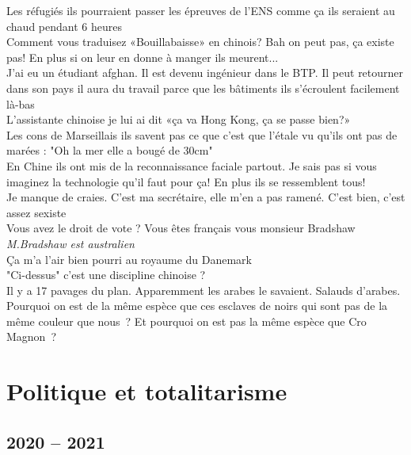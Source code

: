 \documentclass[french, a4paper, openany]{book}
\begin{document}
	\noindent \og Les réfugiés ils pourraient passer les épreuves de l'ENS comme ça ils seraient au chaud pendant 6 heures \fg \\
	\og Comment vous traduisez «Bouillabaisse» en chinois? Bah on peut pas, ça existe pas! En plus si on leur en donne à manger ils meurent... \fg \\
	\og J'ai eu un étudiant afghan. Il est devenu ingénieur dans le BTP. Il peut retourner dans son pays il aura du travail parce que les bâtiments ils s'écroulent facilement là-bas \fg \\
	\og L'assistante chinoise je lui ai dit «ça va Hong Kong, ça se passe bien?» \fg \\
	\og Les cons de Marseillais ils savent pas ce que c'est que l'étale vu qu'ils ont pas de marées : "Oh la mer elle a bougé de 30cm" \fg \\
	\og En Chine ils ont mis de la reconnaissance faciale partout. Je sais pas si vous imaginez la technologie qu'il faut pour ça! En plus ils se ressemblent tous! \fg \\
	\og Je manque de craies. C'est ma secrétaire, elle m'en a pas ramené. C'est bien, c'est assez sexiste \fg \\
	\og Vous avez le droit de vote ? Vous êtes français vous monsieur Bradshaw \fg \emph{M.Bradshaw est australien} \\
	\og Ça m'a l'air bien pourri au royaume du Danemark \fg \\
	\og "Ci-dessus" c'est une discipline chinoise ? \fg \\
	\og Il y a 17 pavages du plan. Apparemment les arabes le savaient. Salauds d'arabes. \fg \\
	\og Pourquoi on est de la même espèce que ces esclaves de noirs qui sont pas de la même couleur que nous~? Et pourquoi on est pas la même espèce que Cro Magnon~? \fg \\

\chapter{Politique et totalitarisme}

\section{2020 -- 2021}
\end{document}
